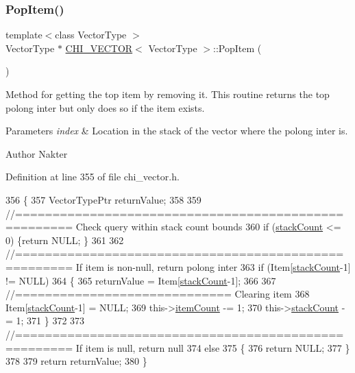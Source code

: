 \subsubsection{\texorpdfstring{Pop\+Item()}{PopItem()}}
{\footnotesize\ttfamily template$<$class Vector\+Type $>$ \\
Vector\+Type $\ast$ \hyperlink{class_c_h_i___v_e_c_t_o_r}{C\+H\+I\+\_\+\+V\+E\+C\+T\+OR}$<$ Vector\+Type $>$\+::Pop\+Item (\begin{DoxyParamCaption}{ }\end{DoxyParamCaption})}

Method for getting the top item by removing it. This routine returns the top polong inter but only does so if the item exists.


\begin{DoxyParams}{Parameters}
{\em index} & Location in the stack of the vector where the polong inter is.\\
\hline
\end{DoxyParams}
\begin{DoxyAuthor}{Author}
Nakter 
\end{DoxyAuthor}


Definition at line 355 of file chi\+\_\+vector.\+h.


\begin{DoxyCode}
356 \{
357     VectorTypePtr returnValue;
358 
359     \textcolor{comment}{//===================================================== Check query within stack count bounds}
360     \textcolor{keywordflow}{if} (\hyperlink{class_c_h_i___v_e_c_t_o_r_a91ef30712b0ead293dfe1adc29fee555}{stackCount} <= 0) \{\textcolor{keywordflow}{return} NULL; \}
361 
362     \textcolor{comment}{//===================================================== If item is non-null, return polong inter}
363     \textcolor{keywordflow}{if} (Item[\hyperlink{class_c_h_i___v_e_c_t_o_r_a91ef30712b0ead293dfe1adc29fee555}{stackCount}-1] != NULL)
364     \{
365         returnValue =  Item[\hyperlink{class_c_h_i___v_e_c_t_o_r_a91ef30712b0ead293dfe1adc29fee555}{stackCount}-1];
366 
367         \textcolor{comment}{//============================= Clearing item}
368         Item[\hyperlink{class_c_h_i___v_e_c_t_o_r_a91ef30712b0ead293dfe1adc29fee555}{stackCount}-1] = NULL;
369         this->\hyperlink{class_c_h_i___v_e_c_t_o_r_a0d37a8a4650059da0888be2d9c38487a}{itemCount}    -= 1;
370         this->\hyperlink{class_c_h_i___v_e_c_t_o_r_a91ef30712b0ead293dfe1adc29fee555}{stackCount} -= 1;
371     \}
372 
373     \textcolor{comment}{//===================================================== If item is null, return null}
374     \textcolor{keywordflow}{else}
375     \{
376         \textcolor{keywordflow}{return} NULL;
377     \}
378 
379     \textcolor{keywordflow}{return} returnValue;
380 \}
\end{DoxyCode}
\mbox{\label{class_c_h_i___v_e_c_t_o_r_ae646184dd90d776f313e502780adf636_ae646184dd90d776f313e502780adf636}} 
